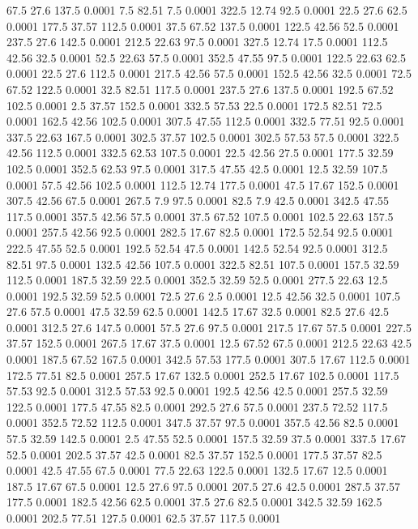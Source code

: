 67.5	27.6	137.5	0.0001
7.5	82.51	7.5	0.0001
322.5	12.74	92.5	0.0001
22.5	27.6	62.5	0.0001
177.5	37.57	112.5	0.0001
37.5	67.52	137.5	0.0001
122.5	42.56	52.5	0.0001
237.5	27.6	142.5	0.0001
212.5	22.63	97.5	0.0001
327.5	12.74	17.5	0.0001
112.5	42.56	32.5	0.0001
52.5	22.63	57.5	0.0001
352.5	47.55	97.5	0.0001
122.5	22.63	62.5	0.0001
22.5	27.6	112.5	0.0001
217.5	42.56	57.5	0.0001
152.5	42.56	32.5	0.0001
72.5	67.52	122.5	0.0001
32.5	82.51	117.5	0.0001
237.5	27.6	137.5	0.0001
192.5	67.52	102.5	0.0001
2.5	37.57	152.5	0.0001
332.5	57.53	22.5	0.0001
172.5	82.51	72.5	0.0001
162.5	42.56	102.5	0.0001
307.5	47.55	112.5	0.0001
332.5	77.51	92.5	0.0001
337.5	22.63	167.5	0.0001
302.5	37.57	102.5	0.0001
302.5	57.53	57.5	0.0001
322.5	42.56	112.5	0.0001
332.5	62.53	107.5	0.0001
22.5	42.56	27.5	0.0001
177.5	32.59	102.5	0.0001
352.5	62.53	97.5	0.0001
317.5	47.55	42.5	0.0001
12.5	32.59	107.5	0.0001
57.5	42.56	102.5	0.0001
112.5	12.74	177.5	0.0001
47.5	17.67	152.5	0.0001
307.5	42.56	67.5	0.0001
267.5	7.9	97.5	0.0001
82.5	7.9	42.5	0.0001
342.5	47.55	117.5	0.0001
357.5	42.56	57.5	0.0001
37.5	67.52	107.5	0.0001
102.5	22.63	157.5	0.0001
257.5	42.56	92.5	0.0001
282.5	17.67	82.5	0.0001
172.5	52.54	92.5	0.0001
222.5	47.55	52.5	0.0001
192.5	52.54	47.5	0.0001
142.5	52.54	92.5	0.0001
312.5	82.51	97.5	0.0001
132.5	42.56	107.5	0.0001
322.5	82.51	107.5	0.0001
157.5	32.59	112.5	0.0001
187.5	32.59	22.5	0.0001
352.5	32.59	52.5	0.0001
277.5	22.63	12.5	0.0001
192.5	32.59	52.5	0.0001
72.5	27.6	2.5	0.0001
12.5	42.56	32.5	0.0001
107.5	27.6	57.5	0.0001
47.5	32.59	62.5	0.0001
142.5	17.67	32.5	0.0001
82.5	27.6	42.5	0.0001
312.5	27.6	147.5	0.0001
57.5	27.6	97.5	0.0001
217.5	17.67	57.5	0.0001
227.5	37.57	152.5	0.0001
267.5	17.67	37.5	0.0001
12.5	67.52	67.5	0.0001
212.5	22.63	42.5	0.0001
187.5	67.52	167.5	0.0001
342.5	57.53	177.5	0.0001
307.5	17.67	112.5	0.0001
172.5	77.51	82.5	0.0001
257.5	17.67	132.5	0.0001
252.5	17.67	102.5	0.0001
117.5	57.53	92.5	0.0001
312.5	57.53	92.5	0.0001
192.5	42.56	42.5	0.0001
257.5	32.59	122.5	0.0001
177.5	47.55	82.5	0.0001
292.5	27.6	57.5	0.0001
237.5	72.52	117.5	0.0001
352.5	72.52	112.5	0.0001
347.5	37.57	97.5	0.0001
357.5	42.56	82.5	0.0001
57.5	32.59	142.5	0.0001
2.5	47.55	52.5	0.0001
157.5	32.59	37.5	0.0001
337.5	17.67	52.5	0.0001
202.5	37.57	42.5	0.0001
82.5	37.57	152.5	0.0001
177.5	37.57	82.5	0.0001
42.5	47.55	67.5	0.0001
77.5	22.63	122.5	0.0001
132.5	17.67	12.5	0.0001
187.5	17.67	67.5	0.0001
12.5	27.6	97.5	0.0001
207.5	27.6	42.5	0.0001
287.5	37.57	177.5	0.0001
182.5	42.56	62.5	0.0001
37.5	27.6	82.5	0.0001
342.5	32.59	162.5	0.0001
202.5	77.51	127.5	0.0001
62.5	37.57	117.5	0.0001
